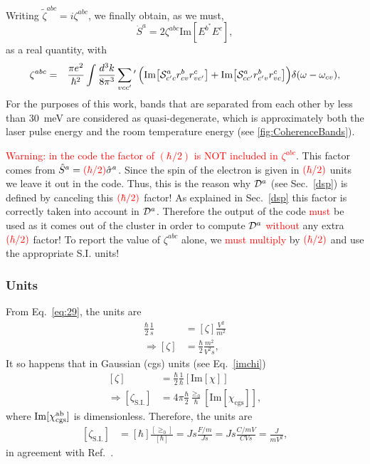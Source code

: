 \documentclass[floatfix,prb,aps,superscriptaddress,11pt]{revtex4}
\begin{document}
Writing $\tilde\zeta^{abc}=i\zeta^{abc}$, we finally obtain, as we must,
\begin{equation}\label{sdotnew}
\dot{S}^a =2\zeta^{abc}\mbox{Im}[
E^{b^*}
E^c
]
,
\end{equation}
as a real quantity, with
\begin{eqnarray}\label{trace53}
\zeta^{abc}
&=&
\frac{\pi e^2}{\hbar^2}
\int\frac{d^3k}{8\pi^3}
\sum_{vcc'}\phantom{}^\prime\,
\Big(
\mbox{Im}\big[
{\cal S}^a_{c'c}r^b_{cv}r^c_{vc'}
\big]
+
\mbox{Im}\big[
{\cal S}^a_{cc'}r^b_{c'v}r^c_{vc}
\big]
\Big)
\delta(\omega-\omega_{cv})
,
\end{eqnarray}
For the purposes of this work, bands that are separated from each
other by less than 30~meV are considered as quasi-degenerate, which is
approximately both the laser pulse energy and the room temperature
energy (see \ref{fig:CoherenceBands}).

\textcolor{red}{Warning: in the code the factor of $(\hbar/2)$ is NOT
  included in $\zeta^{abc}$}. This factor comes from
$\hat S^a=\textcolor{red}{(\hbar/2)}\hat {\sigma}^a$. Since the spin of the
electron is given in $\textcolor{red}{(\hbar/2)}$ units we leave it
out in the code. Thus, this is the reason why ${\cal D}^a$ (see
Sec.~\ref{dsp}) is defined by canceling this
$\textcolor{red}{(\hbar/2)}$ factor! As explained in
Sec.~\ref{dsp} this factor is correctly taken into account in
${\cal D}^a$. Therefore the output of the code \textcolor{red}{must} be used as
it comes out of the cluster in order to compute ${\cal D}^a$ \textcolor{red}{without} any extra
$\textcolor{red}{(\hbar/2)}$ factor!  
To report the value of $\zeta^{abc}$ alone, we
\textcolor{red}{must multiply} by $\textcolor{red}{(\hbar/2)}$ and use
the appropriate S.I. units!

\subsubsection{Units}

From Eq.~\eqref{eq:29}, the units are
\begin{align}\label{n.100}
\frac{\hbar}{2}
\frac{1}{s}&=[\zeta]\frac{V^2}{m^2}
\nonumber\\
\Rightarrow
[\zeta]&=\frac{\hbar}{2}
\frac{m^2}{V^2s}
,
\end{align}
It so happens that in Gaussian (cgs) units  (see Eq.~\eqref{imchi}) 
\begin{align}\label{rnn.n2}
[\zeta]&=\frac{\hbar}{2}
\frac{1}{\hbar}
[\mathrm{Im}[\chi]]
\nonumber\\
\Rightarrow  
[\zeta_{\mathrm{S.I.}}]&=4\pi\frac{\hbar}{2}\frac{\ge_0}{\hbar}
[\mathrm{Im}[\chi_{\mathrm{cgs}}]]
,
\end{align}  
where $\mathrm{Im}[\chi^{\mathrm{a}\mathrm{b}}_{\mathrm{cgs}}]$ is  
dimensionless.  
Therefore, the units are 
\begin{align}\label{rnn.n3}
[\zeta_{\mathrm{S.I.}}]&=[\hbar]\frac{[\ge_0]}{[\hbar]}
=Js 
\frac{F/m}{Js}=Js\frac{C/mV}{CVs}
=
\frac{J}{mV^2}
,
\end{align}
in agreement with Ref.~. 
\end{document}
